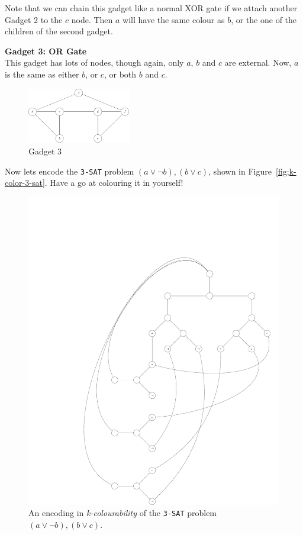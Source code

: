 \begin{description}
    Note that we can chain this gadget like a normal XOR gate if we attach
    another Gadget 2 to the $c$ node. Then $a$ will have the same colour as $b$,
    or the one of the children of the second gadget.

  \item \textbf{Gadget 3: OR Gate}\\
    This gadget has lots of nodes, though again, only $a$, $b$ and $c$ are 
    external. Now, $a$ is the same as either $b$, or $c$, or both $b$ and $c$.

    \begin{figure}[H]
      \centering
      \includegraphics[width=0.4\textwidth]{diagrams/graph13}
      \caption{Gadget 3}
      \label{fig:gadget3}
    \end{figure}
\end{description}

Now lets encode the \texttt{3-SAT} problem $(a \vee \neg b), (b \vee c)$, shown
in Figure~\ref{fig;k-color-3-sat}. Have a go at colouring it in yourself!

\begin{figure}[H]
  \centering
  \includegraphics[height=\textwidth,angle=90]{diagrams/graph14}
  \caption{An encoding in \textit{k-colourability} of the \texttt{3-SAT} 
  problem $(a \vee \neg b), (b \vee c)$.}
  \label{fig:k-colour-3-sat}
\end{figure}

